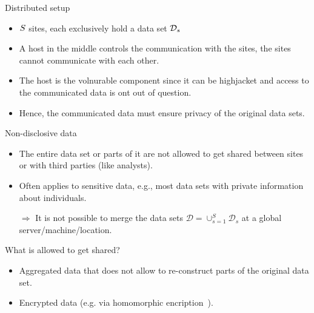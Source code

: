 \documentclass[t,10pt]{beamer}
\begin{document}
\begin{frame}{Distributed setup}
  \begin{itemize}
    \item $S$ sites, each exclusively hold a data set $\mathcal{D}_s$
    \item A host in the middle controls the communication with the sites, the sites cannot communicate with each other.
    \item The host is the volnurable component since it can be highjacket and access to the communicated data is ont out of question.
    \item Hence, the communicated data must ensure privacy of the original data sets.
  \end{itemize}
\end{frame}

\begin{frame}{Non-disclosive data}
  \begin{itemize}
    \item The entire data set or parts of it are not allowed to get shared between sites or with third parties (like analysts).
    \item Often applies to sensitive data, e.g., most data sets with private information about individuals.
  \end{itemize}
  \begin{itemize}
    \item[$\Rightarrow$] It is not possible to merge the data sets $\mathcal{D} = \cup_{s=1}^S \mathcal{D}_s$ at a global server/machine/location.
  \end{itemize}
  What is allowed to get shared?
  \begin{itemize}
    \item Aggregated data that does not allow to re-construct parts of the original data set.
    \item Encrypted data (e.g. via homomorphic encription~\citep{gentry2009fully}).
  \end{itemize}
\end{frame}
\end{document}

